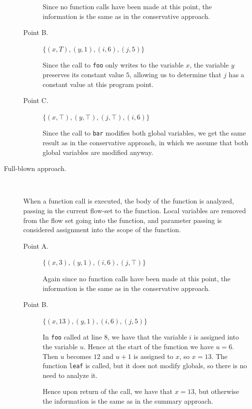 \documentclass[letterpaper,11pt]{article}
\newcommand{\codesnip}{\texttt}
\begin{document}
\begin{description}
\begin{description}
        Since no function calls have been made at this point, the information
        is the same as in the conservative approach.

      \item[Point B.]
        $\{ (x, T), (y, 1), (i, 6), (j, 5) \}$

        Since the call to \codesnip{foo} only writes to the variable $x$, the
        variable $y$ preserves its constant value $5$, allowing us to determine
        that $j$ has a constant value at this program point.

      \item[Point C.]
        $\{ (x, \top), (y, \top), (j, \top), (i, 6) \}$

        Since the call to \codesnip{bar} modifies both global variables, we get
        the same result as in the conservative approach, in which we assume
        that both global variables are modified anyway.
    \end{description}

  \item[Full-blown approach.] ~

    When a function call is executed, the body of the function is analyzed,
    passing in the current flow-set to the function. Local variables are
    removed from the flow set going into the function, and parameter passing is
    considered assignment into the scope of the function.

    \begin{description}
      \item[Point A.]
        $\{ (x, 3), (y, 1), (i, 6), (j, \top) \}$

        Again since no function calls have been made at this point, the
        information is the same as in the conservative approach.

      \item[Point B.]
        $\{ (x, 13), (y, 1), (i, 6), (j, 5) \}$

        In \codesnip{foo} called at line $8$, we have that the variable $i$
        is assigned into the variable $u$. Hence at the start of the function
        we have $u = 6$. Then $u$ becomes $12$ and $u + 1$ is assigned to $x$,
        so $x = 13$. The function \codesnip{leaf} is called, but it does not
        modify globals, so there is no need to analyze it.

        Hence upon return of the call, we have that $x = 13$, but otherwise the
        information is the same as in the summary approach.


\end{description}
\end{description}
\end{document}
